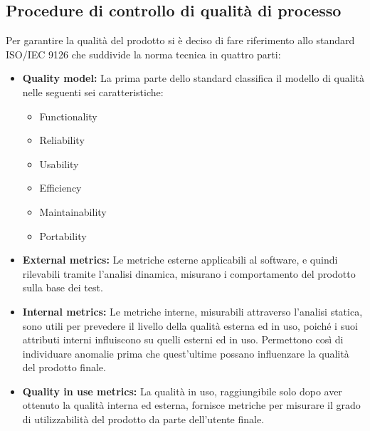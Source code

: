 	\subsection{Procedure di controllo di qualità di processo}
	Per garantire la qualità del prodotto si è deciso di fare riferimento allo standard ISO/IEC 9126 che suddivide la norma tecnica in quattro parti:
		\begin{itemize}
			\item \textbf{Quality model: } \textnormal{La prima parte dello standard classifica il modello di qualità nelle seguenti sei caratteristiche:}
				\begin{itemize}
					\item \textnormal{Functionality}
					\item \textnormal{Reliability}
					\item \textnormal{Usability}
					\item \textnormal{Efficiency}
					\item \textnormal{Maintainability}
					\item \textnormal{Portability}
				\end{itemize}
			\item \textbf{External metrics: } \textnormal{Le metriche esterne applicabili al software, e quindi rilevabili tramite l'analisi dinamica, misurano i comportamento del prodotto sulla base dei test.}
			\item \textbf{Internal metrics: } \textnormal{Le metriche interne, misurabili attraverso l'analisi statica, sono utili per prevedere il livello della qualità esterna ed in uso, poiché i suoi attributi interni influiscono su quelli esterni ed in uso. Permettono così di individuare anomalie prima che quest'ultime possano influenzare la qualità del prodotto finale.}
			\item \textbf{Quality in use metrics: } \textnormal{La qualità in uso, raggiungibile solo dopo aver ottenuto la qualità interna ed esterna, fornisce metriche per misurare il grado di utilizzabilità del prodotto da parte dell'utente finale.}
		\end{itemize}